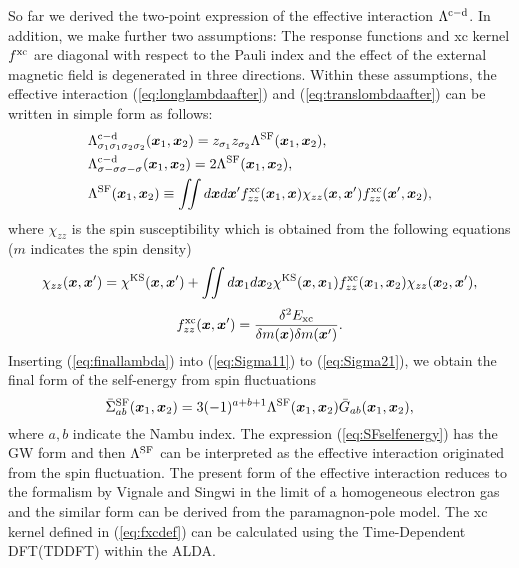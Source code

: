 So far we derived the two-point expression of the effective interaction $\Lambda^{\rm c - \rm d}$.
In addition, we make further two assumptions: The response functions and xc kernel $f^{\rm xc}$ are
diagonal with respect to the Pauli index and the effect of the external magnetic field is degenerated
in three directions. Within these assumptions, the effective interaction (\ref{eq:longlambdaafter}) and
(\ref{eq:translombdaafter}) can be written in simple form as follows:
%
\begin{equation}
	\begin{split}
	&\Lambda^{\rm c - \rm d}_{\sigma_1\sigma_1\sigma_2\sigma_2}(\bm x_1, \bm x_2) = 
	z_{\sigma_1}z_{\sigma_2}\Lambda^{\rm SF}(\bm x_1,\bm x_2), \\
	&\Lambda^{\rm c - \rm d}_{\sigma-\sigma\sigma-\sigma}(\bm x_1, \bm x_2) = 
	2\Lambda^{\rm SF}(\bm x_1,\bm x_2), \\
	&\Lambda^{\rm SF}(\bm x_1,\bm x_2) \equiv \iint d\bm x d\bm x'
	f^{\rm xc}_{zz}(\bm x_1,\bm x)\chi_{zz}(\bm x,\bm x')f^{\rm xc}_{zz}(\bm x',\bm x_2),
	\label{eq:finallambda}
\end{split}
\end{equation}
%
where $\chi_{zz}$ is the spin susceptibility which is obtained from the following equations
($m$ indicates the spin density)
%
\begin{equation}
	\chi_{zz}(\bm x,\bm x') = \chi^{\rm KS}(\bm x,\bm x') + 
	\iint d\bm x_1 d\bm x_2 \chi^{\rm KS}(\bm x, \bm x_1)f^{\rm xc}_{zz}(\bm x_1, \bm x_2)
	\chi_{zz}(\bm x_2,\bm x'),
	\label{eq:chis}
\end{equation}
%
\begin{equation}
	f^{\rm xc}_{zz}(\bm x,\bm x') = \frac{\delta^2 E_{\rm xc}}{\delta m(\bm x) \delta m(\bm x')}.
	\label{eq:fxcdef}
\end{equation}
%
Inserting (\ref{eq:finallambda}) into (\ref{eq:Sigma11}) to (\ref{eq:Sigma21}), we obtain the 
final form of the self-energy from spin fluctuations
%
\begin{equation}
	\bar{\Sigma}^{\rm SF}_{ab}(\bm x_1,\bm x_2) = 3(-1)^{a+b+1}
	\Lambda^{\rm SF}(\bm x_1, \bm x_2) \bar{G}_{ab}(\bm x_1, \bm x_2),
	\label{eq:SFselfenergy}
\end{equation}
%
where $a, b$ indicate the Nambu index.
The expression (\ref{eq:SFselfenergy}) has the GW form and then $\Lambda^{\rm SF}$ can be interpreted
as the effective interaction originated from the spin fluctuation.
The present form of the effective interaction reduces to the formalism by Vignale and Singwi\cite{Vignale1985} 
in the limit of a homogeneous electron gas and the similar form can be derived from the 
paramagnon-pole model\cite{Zhu1986}.
The xc kernel defined in (\ref{eq:fxcdef}) can be calculated using the Time-Dependent DFT(TDDFT)
\cite{Runge1984} within the ALDA.

